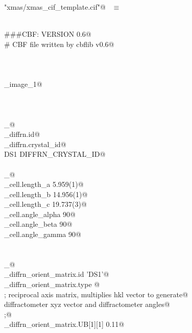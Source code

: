\documentclass[10pt,a4paper,twoside,notitlepage]{article}
\begin{document}
\begin{flushleft} \small \label{scrap22}
\verb@"xmas/xmas_cif_template.cif"@\nobreak\ {\footnotesize {} }$\equiv$
\vspace{-1ex}
\begin{list}{}{} \item
\mbox{}\verb@@\\
\mbox{}\verb@###CBF: VERSION 0.6@\\
\mbox{}\verb@# CBF file written by cbflib v0.6@\\
\mbox{}\verb@@\\
\mbox{}\verb@@\\
\mbox{}\verb@@\\
\mbox{}\verb@data_image_1@\\
\mbox{}\verb@@\\
\mbox{}\verb@@\\
\mbox{}\verb@@\\
\mbox{}\verb@loop_@\\
\mbox{}\verb@_diffrn.id@\\
\mbox{}\verb@_diffrn.crystal_id@\\
\mbox{}\verb@ DS1 DIFFRN_CRYSTAL_ID@\\
\mbox{}\verb@@\\
\mbox{}\verb@loop_@\\
\mbox{}\verb@_cell.length_a                     5.959(1)@\\
\mbox{}\verb@_cell.length_b                     14.956(1)@\\
\mbox{}\verb@_cell.length_c                     19.737(3)@\\
\mbox{}\verb@_cell.angle_alpha                  90@\\
\mbox{}\verb@_cell.angle_beta                   90@\\
\mbox{}\verb@_cell.angle_gamma                  90@\\
\mbox{}\verb@@\\
\mbox{}\verb@@\\
\mbox{}\verb@loop_@\\
\mbox{}\verb@_diffrn_orient_matrix.id 'DS1'@\\
\mbox{}\verb@_diffrn_orient_matrix.type @\\
\mbox{}\verb@; reciprocal axis matrix, multiplies hkl vector to generate@\\
\mbox{}\verb@  diffractometer xyz vector and diffractometer angles@\\
\mbox{}\verb@;@\\
\mbox{}\verb@_diffrn_orient_matrix.UB[1][1]            0.11@\\

\end{list}
\end{flushleft}
\end{document}
